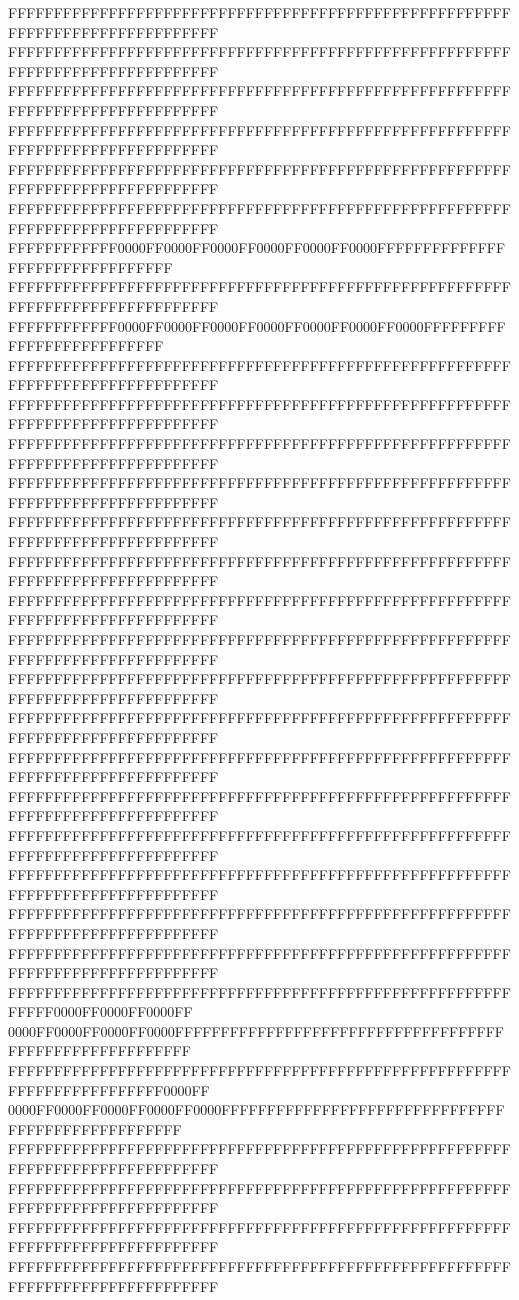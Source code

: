FFFFFFFFFFFFFFFFFFFFFFFFFFFFFFFFFFFFFFFFFFFFFFFFFFFFFFFFFFFFFFFFFFFFFFFFFFFFFF
FFFFFFFFFFFFFFFFFFFFFFFFFFFFFFFFFFFFFFFFFFFFFFFFFFFFFFFFFFFFFFFFFFFFFFFFFFFFFF
FFFFFFFFFFFFFFFFFFFFFFFFFFFFFFFFFFFFFFFFFFFFFFFFFFFFFFFFFFFFFFFFFFFFFFFFFFFFFF
FFFFFFFFFFFFFFFFFFFFFFFFFFFFFFFFFFFFFFFFFFFFFFFFFFFFFFFFFFFFFFFFFFFFFFFFFFFFFF
FFFFFFFFFFFFFFFFFFFFFFFFFFFFFFFFFFFFFFFFFFFFFFFFFFFFFFFFFFFFFFFFFFFFFFFFFFFFFF
FFFFFFFFFFFFFFFFFFFFFFFFFFFFFFFFFFFFFFFFFFFFFFFFFFFFFFFFFFFFFFFFFFFFFFFFFFFFFF
FFFFFFFFFFFF0000FF0000FF0000FF0000FF0000FF0000FFFFFFFFFFFFFFFFFFFFFFFFFFFFFFFF
FFFFFFFFFFFFFFFFFFFFFFFFFFFFFFFFFFFFFFFFFFFFFFFFFFFFFFFFFFFFFFFFFFFFFFFFFFFFFF
FFFFFFFFFFFF0000FF0000FF0000FF0000FF0000FF0000FF0000FFFFFFFFFFFFFFFFFFFFFFFFFF
FFFFFFFFFFFFFFFFFFFFFFFFFFFFFFFFFFFFFFFFFFFFFFFFFFFFFFFFFFFFFFFFFFFFFFFFFFFFFF
FFFFFFFFFFFFFFFFFFFFFFFFFFFFFFFFFFFFFFFFFFFFFFFFFFFFFFFFFFFFFFFFFFFFFFFFFFFFFF
FFFFFFFFFFFFFFFFFFFFFFFFFFFFFFFFFFFFFFFFFFFFFFFFFFFFFFFFFFFFFFFFFFFFFFFFFFFFFF
FFFFFFFFFFFFFFFFFFFFFFFFFFFFFFFFFFFFFFFFFFFFFFFFFFFFFFFFFFFFFFFFFFFFFFFFFFFFFF
FFFFFFFFFFFFFFFFFFFFFFFFFFFFFFFFFFFFFFFFFFFFFFFFFFFFFFFFFFFFFFFFFFFFFFFFFFFFFF
FFFFFFFFFFFFFFFFFFFFFFFFFFFFFFFFFFFFFFFFFFFFFFFFFFFFFFFFFFFFFFFFFFFFFFFFFFFFFF
FFFFFFFFFFFFFFFFFFFFFFFFFFFFFFFFFFFFFFFFFFFFFFFFFFFFFFFFFFFFFFFFFFFFFFFFFFFFFF
FFFFFFFFFFFFFFFFFFFFFFFFFFFFFFFFFFFFFFFFFFFFFFFFFFFFFFFFFFFFFFFFFFFFFFFFFFFFFF
FFFFFFFFFFFFFFFFFFFFFFFFFFFFFFFFFFFFFFFFFFFFFFFFFFFFFFFFFFFFFFFFFFFFFFFFFFFFFF
FFFFFFFFFFFFFFFFFFFFFFFFFFFFFFFFFFFFFFFFFFFFFFFFFFFFFFFFFFFFFFFFFFFFFFFFFFFFFF
FFFFFFFFFFFFFFFFFFFFFFFFFFFFFFFFFFFFFFFFFFFFFFFFFFFFFFFFFFFFFFFFFFFFFFFFFFFFFF
FFFFFFFFFFFFFFFFFFFFFFFFFFFFFFFFFFFFFFFFFFFFFFFFFFFFFFFFFFFFFFFFFFFFFFFFFFFFFF
FFFFFFFFFFFFFFFFFFFFFFFFFFFFFFFFFFFFFFFFFFFFFFFFFFFFFFFFFFFFFFFFFFFFFFFFFFFFFF
FFFFFFFFFFFFFFFFFFFFFFFFFFFFFFFFFFFFFFFFFFFFFFFFFFFFFFFFFFFFFFFFFFFFFFFFFFFFFF
FFFFFFFFFFFFFFFFFFFFFFFFFFFFFFFFFFFFFFFFFFFFFFFFFFFFFFFFFFFFFFFFFFFFFFFFFFFFFF
FFFFFFFFFFFFFFFFFFFFFFFFFFFFFFFFFFFFFFFFFFFFFFFFFFFFFFFFFFFFFFFFFFFFFFFFFFFFFF
FFFFFFFFFFFFFFFFFFFFFFFFFFFFFFFFFFFFFFFFFFFFFFFFFFFFFFFFFFFF0000FF0000FF0000FF
0000FF0000FF0000FF0000FFFFFFFFFFFFFFFFFFFFFFFFFFFFFFFFFFFFFFFFFFFFFFFFFFFFFFFF
FFFFFFFFFFFFFFFFFFFFFFFFFFFFFFFFFFFFFFFFFFFFFFFFFFFFFFFFFFFFFFFFFFFFFFFF0000FF
0000FF0000FF0000FF0000FF0000FFFFFFFFFFFFFFFFFFFFFFFFFFFFFFFFFFFFFFFFFFFFFFFFFF
FFFFFFFFFFFFFFFFFFFFFFFFFFFFFFFFFFFFFFFFFFFFFFFFFFFFFFFFFFFFFFFFFFFFFFFFFFFFFF
FFFFFFFFFFFFFFFFFFFFFFFFFFFFFFFFFFFFFFFFFFFFFFFFFFFFFFFFFFFFFFFFFFFFFFFFFFFFFF
FFFFFFFFFFFFFFFFFFFFFFFFFFFFFFFFFFFFFFFFFFFFFFFFFFFFFFFFFFFFFFFFFFFFFFFFFFFFFF
FFFFFFFFFFFFFFFFFFFFFFFFFFFFFFFFFFFFFFFFFFFFFFFFFFFFFFFFFFFFFFFFFFFFFFFFFFFFFF

